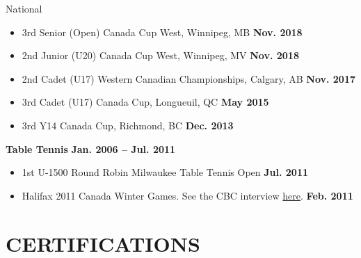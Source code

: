 \documentclass{article}
\begin{document}
    National

    \begin{itemize}
        \item 3rd Senior (Open) Canada Cup West, Winnipeg, MB \hfill \textbf{Nov. 2018}
        \item 2nd Junior (U20) Canada Cup West, Winnipeg, MV \hfill \textbf{Nov. 2018}
        \item 2nd Cadet (U17) Western Canadian Championships, Calgary, AB \hfill \textbf{Nov. 2017}
        \item 3rd Cadet (U17) Canada Cup, Longueuil, QC \hfill \textbf{May 2015}
        \item 3rd Y14 Canada Cup, Richmond, BC \hfill \textbf{Dec. 2013}
    \end{itemize}

    \textbf{Table Tennis} \hfill \textbf{Jan. 2006 -- Jul. 2011}

    \begin{itemize}
        \item 1st U-1500 Round Robin Milwaukee Table Tennis Open \hfill \textbf{Jul. 2011}
        \item Halifax 2011 Canada Winter Games. See the CBC interview \href{http://www.cbc.ca/sports/olympics-sochi-old/table-tennis-player-10-turning-heads-in-halifax-1.1115785}{here}. \hfill \textbf{Feb. 2011}
    \end{itemize}


\section*{\textcolor{my_colour}{CERTIFICATIONS}}
\vspace{-.25em} \hrulefill \vspace{.75em}
\end{document}
